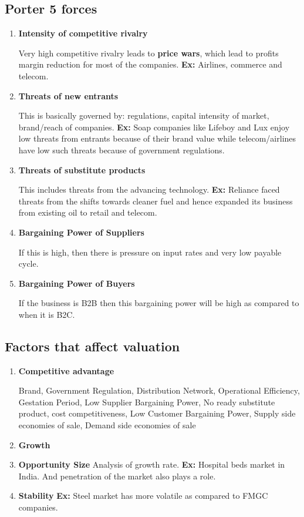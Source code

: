 \documentclass{article}
\begin{document}
\subsection{Porter 5 forces}
\begin{enumerate}
    \item \textbf{Intensity of competitive rivalry} \par
    Very high competitive rivalry leads to \textbf{price wars}, which lead to profits margin reduction for most of the companies. \textbf{Ex:} Airlines, commerce and telecom.  
    \item \textbf{Threats of new entrants} \par
    This is basically governed by: regulations, capital intensity of market, brand/reach of companies. \textbf{Ex:} Soap companies like Lifeboy and Lux enjoy low threats from entrants because of their brand value while telecom/airlines have low such threats because of government regulations. 
    \item \textbf{Threats of substitute products} \par
    This includes threats from the advancing technology. \textbf{Ex:} Reliance faced threats from the shifts towards cleaner fuel and hence expanded its business from existing oil to retail and telecom. 
    \item \textbf{Bargaining Power of Suppliers} \par
    If this is high, then there is pressure on input rates and very low payable cycle. 
    \item \textbf{Bargaining Power of Buyers} \par
    If the business is B2B then this bargaining power will be high as compared to when it is B2C. 
\end{enumerate}
\subsection{Factors that affect valuation}
\begin{enumerate}
    \item \textbf{Competitive advantage} \par
    Brand, Government Regulation, Distribution Network, Operational Efficiency, Gestation Period, Low Supplier Bargaining Power, No ready substitute product, cost competitiveness, Low Customer Bargaining Power, Supply side economies of sale, Demand side economies of sale 
    \item \textbf{Growth}
    \item \textbf{Opportunity Size}
    Analysis of growth rate. \textbf{Ex:} Hospital beds market in India. And penetration of the market also plays a role. 
    \item \textbf{Stability}
    \textbf{Ex:} Steel market has more volatile as compared to FMGC companies. 
\end{enumerate}
\end{document}
